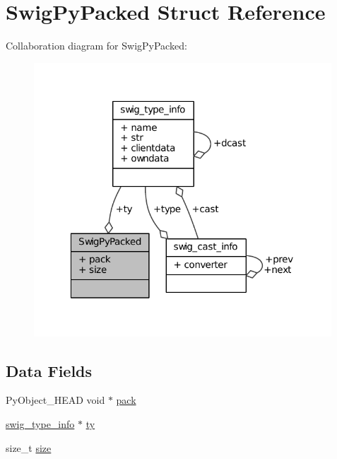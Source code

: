 \hypertarget{struct_swig_py_packed}{\section{Swig\-Py\-Packed Struct Reference}
\label{struct_swig_py_packed}
}


Collaboration diagram for Swig\-Py\-Packed\-:
\nopagebreak
\begin{figure}[H]
\begin{center}
\leavevmode
\includegraphics[width=316pt]{struct_swig_py_packed__coll__graph}
\end{center}
\end{figure}
\subsection*{Data Fields}
\begin{DoxyCompactItemize}
\item 
Py\-Object\-\_\-\-H\-E\-A\-D void $\ast$ \hyperlink{struct_swig_py_packed_ac20a1b03d60c73f985a7f11d841cbf23}{pack}
\item 
\hyperlink{structswig__type__info}{swig\-\_\-type\-\_\-info} $\ast$ \hyperlink{struct_swig_py_packed_a6b6270e5da3083fb1e9476b22a0611ad}{ty}
\item 
size\-\_\-t \hyperlink{struct_swig_py_packed_a854352f53b148adc24983a58a1866d66}{size}
\end{DoxyCompactItemize}


